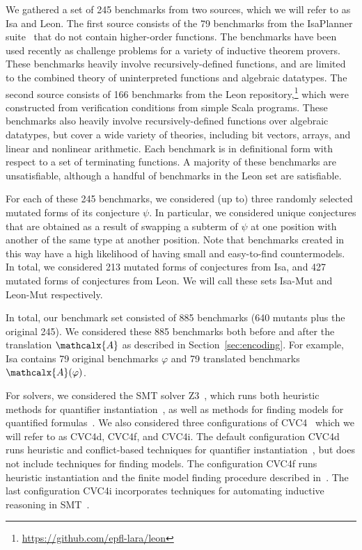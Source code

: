 \documentclass[runningheads,a4paper]{llncs}
\newcommand\cvcd{{\cvc}d\xspace}
\newcommand\cvcf{{\cvc}f\xspace}
\newcommand\cvci{{\cvc}i\xspace}
\newcommand\isa{Isa\xspace}
\newcommand\isam{Isa-Mut\xspace}
\newcommand\leon{Leon\xspace}
\newcommand\leonm{Leon-Mut\xspace}
\newcommand\cvc{CVC4\xspace}
\newcommand\ziii{Z3\xspace}
\newcommand{\conv}{\mathcalx{A}}
\begin{document}
We gathered a set of 245 benchmarks from two sources, which we will refer to as
\isa and \leon. The first source consists of the 79
benchmarks from the IsaPlanner
suite~\cite{DBLP:conf/itp/JohanssonDB10} that do not contain higher-order
functions. The benchmarks have been used recently as challenge problems for a
variety of inductive theorem provers. These benchmarks heavily involve
recursively-defined functions, and are limited to the combined theory of uninterpreted
functions and algebraic datatypes. The second source consists of 166
benchmarks from the Leon repository,\footnote{%
\url{https://github.com/epfl-lara/leon}} which were constructed from
verification conditions from simple Scala programs. These benchmarks also
heavily involve recursively-defined functions over algebraic datatypes, 
but cover a wide variety of theories, including bit vectors, arrays, and linear and
nonlinear arithmetic. Each benchmark is in definitional form with respect to a
set of terminating functions.
%
A majority of these benchmarks are unsatisfiable, although a
handful of benchmarks in the \leon set are satisfiable.

For each of these 245 benchmarks, we considered (up to) three randomly selected
mutated forms of its conjecture $\psi$. In particular, we considered unique
conjectures that are obtained as a result of swapping a subterm of $\psi$ at
one position with another of the same type at another position.
Note that benchmarks created in this way have a high likelihood of having small
and easy-to-find countermodels. In total, we considered 213 mutated forms of
conjectures from \isa, and 427 mutated forms of conjectures from \leon. We will
call these sets \isam and \leonm respectively.

In total, our benchmark set consisted of 885 benchmarks (640 mutants plus the
original 245). We considered these 885 benchmarks both before and after the
translation $\conv$ as described in Section~\ref{sec:encoding}. For example,
\isa contains 79 original benchmarks $\varphi$ and 79 translated benchmarks
$\conv(\varphi)$.

For solvers, we considered the SMT solver \ziii~\cite{de-moura-bjoerner-2008},
which runs both heuristic methods for quantifier instantiation~\cite{MouraBjoerner07},
as well as methods for finding models for quantified formulas~\cite{GeDeM-CAV-09}.
We also considered three configurations of \cvc~\cite{barrett-et-al-2011} which
we will refer to as \cvcd, \cvcf, and \cvci.
The default configuration \cvcd runs heuristic and conflict-based techniques for quantifier instantiation~\cite{ReynoldsTinelliMoura14},
but does not include techniques for finding models.
The configuration \cvcf runs heuristic instantiation and the finite model
finding procedure described in~\cite{ReyEtAl-1-RR-13,reynolds-et-al-2013}. The
last configuration \cvci incorporates techniques for automating inductive
reasoning in SMT~\cite{reynolds-kuncak-2015}.
\end{document}
